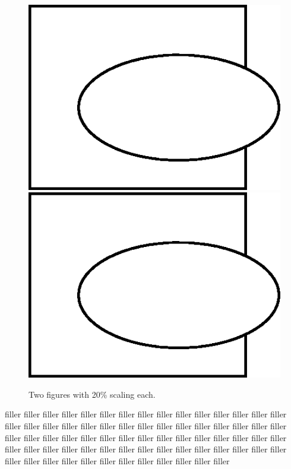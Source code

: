 \documentclass{article}
\begin{document}
\begin{figure}
\begin{center}
\includegraphics[scale=0.2]{fig_oval.png}
\includegraphics[scale=0.2]{fig_oval.png}
\caption{Two figures with 20\% scaling each.} 
\end{center}
\end{figure}

filler filler filler filler filler filler filler filler filler filler filler filler
filler filler filler filler filler filler filler filler filler filler filler filler
filler filler filler filler filler filler filler filler filler filler filler filler
filler filler filler filler filler filler filler filler filler filler filler filler
filler filler filler filler filler filler filler filler filler filler filler filler
filler filler filler filler filler filler filler filler filler filler filler filler
\end{document}
